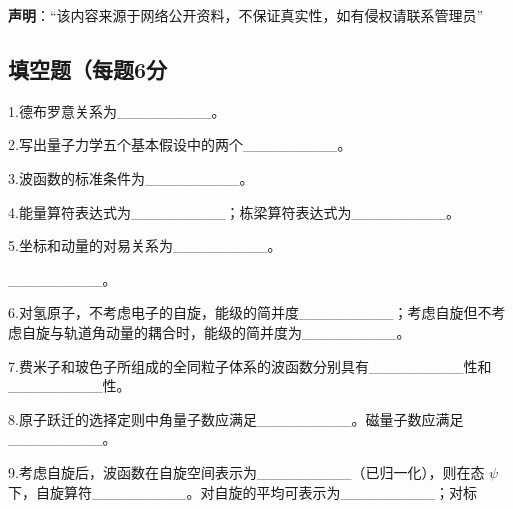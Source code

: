 
\textbf{声明}：“该内容来源于网络公开资料，不保证真实性，如有侵权请联系管理员”

\subsection{填空题（每题6分}

1.德布罗意关系为_________。

2.写出量子力学五个基本假设中的两个_________。

3.波函数的标准条件为_________。

4.能量算符表达式为_________；栋梁算符表达式为_________。

5.坐标和动量的对易关系为_________。

_________。

6.对氢原子，不考虑电子的自旋，能级的简并度_________；考虑自旋但不考虑自旋与轨道角动量的耦合时，能级的简并度为_________。

7.费米子和玻色子所组成的全同粒子体系的波函数分别具有_________性和_________性。

8.原子跃迁的选择定则中角量子数应满足_________。磁量子数应满足_________。

9.考虑自旋后，波函数在自旋空间表示为_________（已归一化），则在态 $\psi$下，自旋算符_________。对自旋的平均可表示为_________；对标